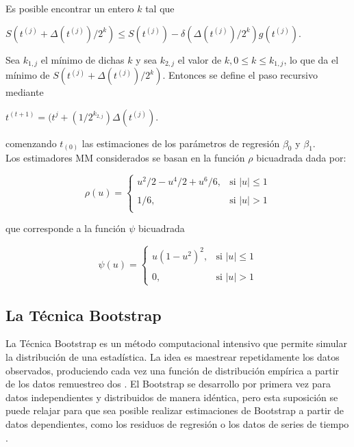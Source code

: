 Es posible encontrar un entero $k$ \parencite{yohai-1987} tal que\\

\begin{center}
{\large	$ S(t^{(j)} + \Delta(t^{(j)} )/2^{k}) \leq S(t^{(j)}) - \delta( \Delta(t^{(j)} )/2^{k} ) g(t^{(j)})$}. \\
\end{center}


Sea $k_{1,j}$ el mínimo de dichas $k$ y sea $k_{2,j}$ el valor de $k, 0 \leq k  \leq k_{1,j}$, lo que da el mínimo de $S(t^{(j)} + \Delta(t^{(j)} )/2^{k})$. Entonces se define el paso recursivo mediante\\

\begin{center}
{\large	$ t^{(t+1)} = (t^{j} + (1/2^{k_{2,j}}) \Delta(t^{(j)} )$}.\\
\end{center}

comenzando $t_{(0)} $ las estimaciones de los parámetros de regresión $\beta_{0}$ y $\beta_{1}$.\\

Los estimadores MM considerados se basan en la función $\rho$ bicuadrada dada por:


\[
\rho(u) =
\begin{cases}
	u^{2}/2 -u^{4}/2 + u^{6}/6	, & \text{si } |u| \leq 1 \\ \\
	1/6,     & \text{si } | u | > 1\\
\end{cases}
\]


que corresponde a la función $\psi$ bicuadrada

\[
\psi(u) =
\begin{cases}
	u(1- u^{2})^{2}	, & \text{si } |u| \leq 1 \\ \\
	0,     & \text{si } | u | > 1
\end{cases}
\]



\subsection{La Técnica Bootstrap}

La Técnica Bootstrap es un método computacional intensivo que permite simular la distribución de una estadística. La idea es maestrear repetidamente los datos observados, produciendo cada vez una función de distribución empírica a partir de los datos remuestreo dos \parencite{zacarias-2023}. El Bootstrap se desarrollo por primera vez para datos independientes y distribuidos de manera idéntica, pero esta suposición se puede relajar para que sea posible realizar estimaciones de Bootstrap a partir de datos dependientes, como los residuos de regresión o los datos de series de tiempo \parencite{givens-2013}.\\


